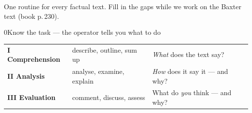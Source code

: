 



%
{One routine for every factual text. Fill in the gaps while we work on the Baxter text (book p.\,230).}

\begin{wsbox}{0}{Know the task — the operator tells you what to do}
\renewcommand{\arraystretch}{1.25}
\begin{tabularx}{\linewidth}{@{}>{\raggedright\arraybackslash}p{30mm}>{\raggedright\arraybackslash}p{45mm}>{\raggedright\arraybackslash}X@{}}
\textbf{I Comprehension} & describe, outline, sum up & \emph{What} does the text say?\\
\textbf{II Analysis} & analyse, examine, explain & \emph{How} does it say it — and why?\\
\textbf{III Evaluation} & comment, discuss, assess & What do \emph{you} think — and why?\\
\end{tabularx}
\end{wsbox}

